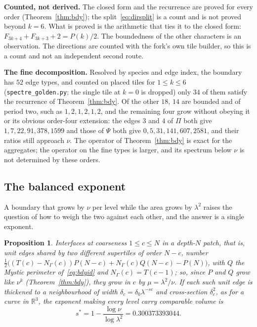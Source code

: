 \documentclass[11pt]{article}
\newtheorem{prop}{Proposition}
\theoremstyle{definition}
\theoremstyle{remark}
\newcommand{\lam}{\lambda}
\newcommand{\code}[1]{\texttt{#1}}
\begin{document}
\textbf{Counted, not derived.}  The closed form and the recurrence are proved for every
order (Theorem~\ref{thm:bdy}); the split~\eqref{eq:dirsplit} is a count
and is not proved beyond $k=6$.  What is proved is the arithmetic that ties it to the
closed form: $F_{3k+4}+F_{3k+3}+2=P(k)/2$.  The boundedness of
the other characters is an observation.  The directions are counted with the
fork's own tile builder, so this is a count and not an independent second
route.

\textbf{The fine decomposition.}  Resolved by species and edge index, the boundary has $52$ edge types,
and counted on placed tiles for $1\le k\le6$ (\code{spectre\_golden.py}; the single tile at $k=0$ is dropped) only $34$ of
them satisfy the recurrence of Theorem~\ref{thm:bdy}.  Of the other $18$, $14$ are bounded and of period two, such as
$1,2,1,2,1,2$, and the remaining four grow without obeying it or its obvious order-four extension: the edges $3$ and $4$
of $\Pi$ both give $1,7,22,91,378,1599$ and those of $\Psi$ both give $0,5,31,141,607,2581$, and their ratios still
approach $\nu$.  The operator of
Theorem~\ref{thm:bdy} is exact for the aggregates; the operator on the fine types is larger, and its
spectrum below $\nu$ is not determined by these orders.

\subsection{The balanced exponent}
\label{sec:sstar}

A boundary that grows by $\nu$ per level while the area grows by $\lam^{2}$
raises the question of how to weigh the two against each other, and the answer
is a single exponent.

\begin{prop}
\label{prop:sstar}
Interfaces at coarseness $1\le c\le N$ in a depth-$N$ patch, that is, unit edges shared by two
different supertiles of order $N-c$, number
$\tfrac12\bigl((T(c)-N_{\Gamma}(c))P(N-c)+N_{\Gamma}(c)Q(N-c)-P(N)\bigr)$, with $Q$ the Mystic
perimeter of~\eqref{eq:bdyid} and $N_{\Gamma}(c)=T(c-1)$; so, since $P$ and $Q$ grow like $\nu^{k}$
(Theorem~\ref{thm:bdy}),
they grow in $c$ by $\mu=\lam^{2}/\nu$.  If
each such unit edge is thickened to a neighbourhood of width
$\delta_{c}=\delta_{0}\lam^{-sc}$ and cross-section $\delta_{c}^{2}$, as for a
curve in $\mathbb{R}^{3}$, the exponent making every level carry comparable
volume is
%
\begin{equation}
\label{eq:sstar}
s^{*}=1-\frac{\log\nu}{\log\lam^{2}}=0.300373393044 .
\end{equation}
\end{prop}
\end{document}
